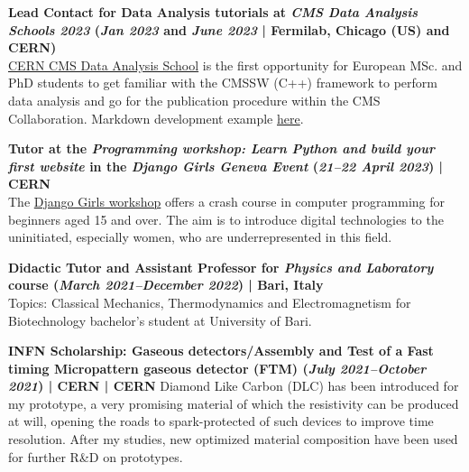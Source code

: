 \documentclass[11pt]{res}
\begin{document}
\begin{resume}
\textbf{Lead Contact for Data Analysis tutorials at \textit{CMS Data Analysis Schools 2023} (\textit{Jan 2023} and \textit{June 2023} | Fermilab, Chicago (US) and CERN)}\\
\href{https://indico.cern.ch/event/1257234/}{CERN CMS Data Analysis School} is the first opportunity for European MSc. and PhD students to get familiar with the CMSSW (C++) framework to perform data analysis and go for the publication procedure within the CMS Collaboration. Markdown development example \href{https://bdanzi.github.io/trackingvertexing/index.html}{here}.

\textbf{Tutor at the \textit{Programming workshop: Learn Python and build your first website} in the \textit{Django Girls Geneva Event} (\textit{21--22 April 2023}) | CERN}\\
The \href{https://djangogirls.org/en/geneva_en/}{Django Girls workshop} offers a crash course in computer programming for beginners aged 15 and over. The aim is to introduce digital technologies to the uninitiated, especially women, who are underrepresented in this field.

\textbf{Didactic Tutor and Assistant Professor for \textit{Physics and Laboratory} course (\textit{March 2021--December 2022}) | Bari, Italy}\\
Topics: Classical Mechanics, Thermodynamics and Electromagnetism for Biotechnology bachelor's student at University of Bari.

\textbf{INFN Scholarship: Gaseous detectors/Assembly and Test of a Fast timing Micropattern gaseous detector (FTM) \textbf{(\textit{July 2021--October 2021}) | CERN} | CERN} 
Diamond Like Carbon (DLC) has been introduced for my prototype, a very promising material of which the resistivity can be produced at will, opening the roads to spark-protected of such devices to improve time resolution. After my studies, new optimized material composition have been used for further R\&D on prototypes.


\end{resume}
\end{document}

